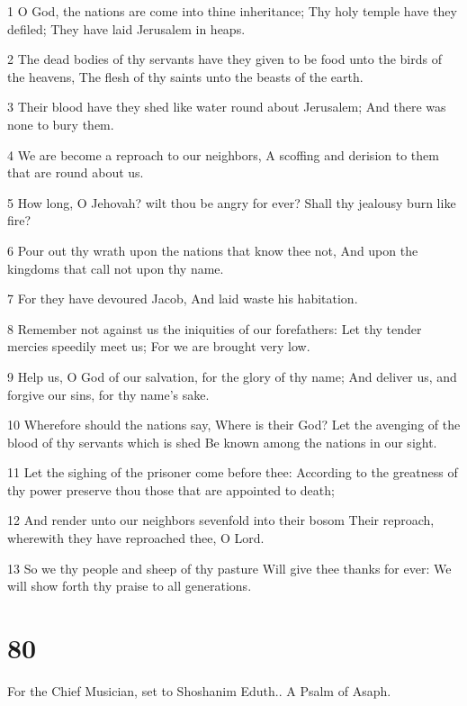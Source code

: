 \par 1 O God, the nations are come into thine inheritance; Thy holy temple have they defiled; They have laid Jerusalem in heaps.
\par 2 The dead bodies of thy servants have they given to be food unto the birds of the heavens, The flesh of thy saints unto the beasts of the earth.
\par 3 Their blood have they shed like water round about Jerusalem; And there was none to bury them.
\par 4 We are become a reproach to our neighbors, A scoffing and derision to them that are round about us.
\par 5 How long, O Jehovah? wilt thou be angry for ever? Shall thy jealousy burn like fire?
\par 6 Pour out thy wrath upon the nations that know thee not, And upon the kingdoms that call not upon thy name.
\par 7 For they have devoured Jacob, And laid waste his habitation.
\par 8 Remember not against us the iniquities of our forefathers: Let thy tender mercies speedily meet us; For we are brought very low.
\par 9 Help us, O God of our salvation, for the glory of thy name; And deliver us, and forgive our sins, for thy name's sake.
\par 10 Wherefore should the nations say, Where is their God? Let the avenging of the blood of thy servants which is shed Be known among the nations in our sight.
\par 11 Let the sighing of the prisoner come before thee: According to the greatness of thy power preserve thou those that are appointed to death;
\par 12 And render unto our neighbors sevenfold into their bosom Their reproach, wherewith they have reproached thee, O Lord.
\par 13 So we thy people and sheep of thy pasture Will give thee thanks for ever: We will show forth thy praise to all generations.

\chapter{80}

\par For the Chief Musician, set to Shoshanim Eduth.. A Psalm of Asaph.

